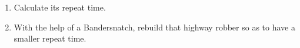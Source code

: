 \begin{multicols}{2}
\begin{problem}
		\begin{enumerate}[label=\bf\color{ocre}(\alph*)]
			\item {} Calculate its repeat time.
			
			\item {} With the help of a Bandersnatch, rebuild that highway robber so as to have a smaller repeat time.
		\end{enumerate}
	\end{problem}
	
	
	
	
\end{multicols}
\normalsize\vspace*{0.01cm}
